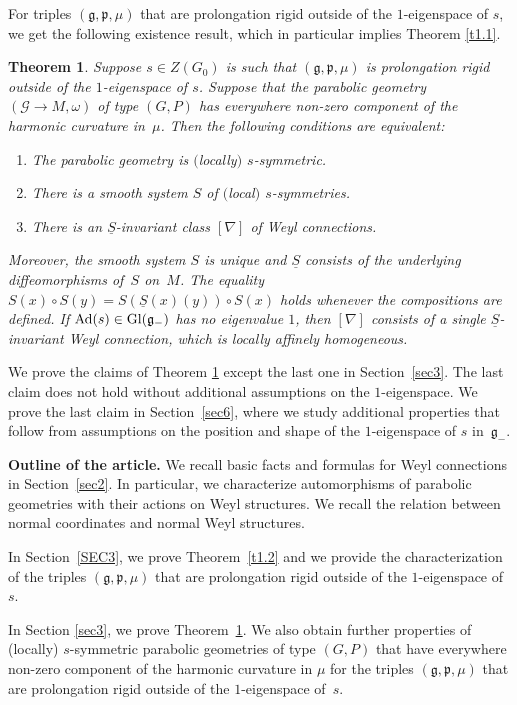\documentclass[pdftex]{sigma}
\newcommand{\om}{\omega}
\newcommand{\un}{\underline}
\newcommand{\ba}{\mathcal{G}}
\newcommand{\fg}{\mathfrak g}
\newcommand{\fp}{\mathfrak p}
\newcommand{\Ad}{{\rm Ad}}
\numberwithin{equation}{section}
\newtheorem{Theorem}{Theorem}[section]
\begin{document}
For triples $(\fg,\fp,\mu)$ that are prolongation rigid outside of the $1$-eigenspace of $s$, we get the following existence result, which in particular implies Theorem \ref{t1.1}.

\begin{Theorem}\label{t1.3}
Suppose $s\in Z(G_0)$ is such that $(\fg,\fp,\mu)$ is prolongation rigid outside of the $1$-eigenspace of $s$. Suppose that the parabolic geometry $(\ba\to M,\om)$ of type $(G,P)$ has everywhere non-zero component of the harmonic curvature in~$\mu$. Then the following conditions are equivalent:
\begin{enumerate}\itemsep=0pt
\item[$1.$] The parabolic geometry is $($locally$)$ $s$-symmetric.
\item[$2.$] There is a smooth system $S$ of $($local$)$ $s$-symmetries.
\item[$3.$] There is an $\un S$-invariant class $[\nabla]$ of Weyl connections.
\end{enumerate}
Moreover, the smooth system $S$ is unique and $\un S$ consists of the underlying diffeomorphisms of~$S$ on~$M$. The equality $S(x) \circ S(y)=S(\un S(x)(y)) \circ S(x)$ holds whenever the compositions are defined. If $\Ad(s)\in {\rm Gl}(\fg_-)$ has no eigenvalue $1$, then $[\nabla]$ consists of a single $\un S$-invariant Weyl connection, which is locally affinely homogeneous.
\end{Theorem}

We prove the claims of Theorem \ref{t1.3} except the last one in Section~\ref{sec3}. The last claim does not hold without additional assumptions on the $1$-eigenspace. We prove the last claim in Section~\ref{sec6}, where we study additional properties that follow from assumptions on the position and shape of the $1$-eigenspace of $s$ in~$\fg_-$.

{\bf Outline of the article.} We recall basic facts and formulas for Weyl connections in Section~\ref{sec2}. In particular, we characterize automorphisms of parabolic geometries with their actions on Weyl structures. We recall the relation between normal coordinates and normal Weyl structures.

In Section~\ref{SEC3}, we prove Theorem~\ref{t1.2} and we provide the characterization of the triples $(\fg,\fp,\mu)$ that are prolongation rigid outside of the $1$-eigenspace of~$s$.

In Section \ref{sec3}, we prove Theorem~\ref{t1.3}. We also obtain further properties of (locally) $s$-symmetric parabolic geometries of type $(G,P)$ that have everywhere non-zero component of the harmonic curvature in $\mu$ for the triples $(\fg,\fp,\mu)$ that are prolongation rigid outside of the $1$-eigenspace of~$s$.
\end{document}
